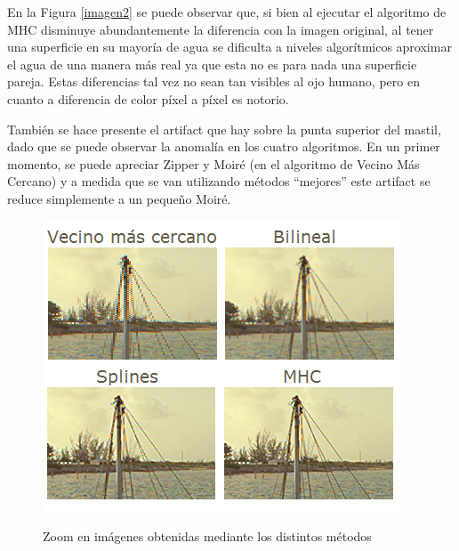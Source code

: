 \documentclass[a4paper]{article}
\begin{document}
En la Figura \ref{imagen2}  se puede observar que, si bien al ejecutar el algoritmo de MHC disminuye abundantemente la diferencia con la imagen original, al tener una superficie en su mayor\'ia de agua se dificulta a niveles algor\'itmicos aproximar el agua de una manera m\'as real ya que esta no es para nada una superficie pareja. Estas diferencias tal vez no sean tan visibles al ojo humano, pero en cuanto a diferencia de color p\'ixel a p\'ixel es notorio.

 Tambi\'en se hace presente el artifact que hay sobre la punta superior del mastil, dado que se puede observar la anomalía en los cuatro algoritmos. En un primer momento, se puede apreciar Zipper y Moir\'e
(en el algoritmo de Vecino M\'as Cercano) y a medida que se van utilizando m\'etodos ``mejores'' este artifact se reduce simplemente a un peque\~no Moir\'e. \\


\begin{figure}[h!]
    \caption{Zoom en imágenes obtenidas mediante los distintos métodos}
    \begin{center}
    \includegraphics[scale=1.2]{imagenes/comparacion/02/mastil}
    \label{mastil}
  \end{center}
\end{figure}

\newpage
\end{document}
